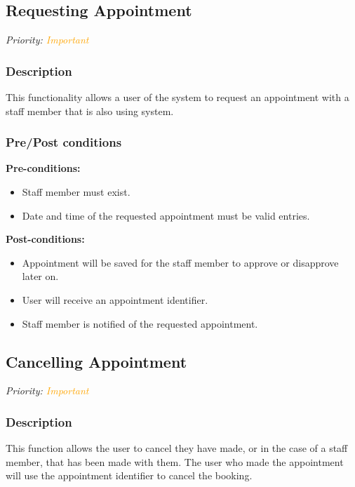 \subsection{Requesting Appointment}
\textit{Priority: \textcolor{orange}{Important}} 

\subsubsection{Description}

This functionality allows a user of the system to request an appointment with a staff member that is also using system. 


\subsubsection{Pre/Post conditions}
\textbf{Pre-conditions:} 
	\begin{itemize}
		\item Staff member must exist.
		\item Date and time of the requested appointment must be valid entries.
	\end{itemize}
\textbf{Post-conditions:} 
	\begin{itemize}
		\item Appointment will be saved for the staff member to approve or disapprove later on.
		\item User will receive an appointment identifier.
		\item Staff member is notified of the requested appointment. 
	\end{itemize}

\subsection{Cancelling Appointment}
\textit{Priority: \textcolor{orange}{Important}} 

\subsubsection{Description}
This function allows the user to cancel they have made, or in the case of a staff member, that has been made with them. The user who made the appointment will use the appointment identifier to cancel the booking. 


